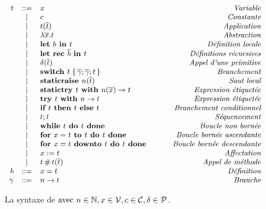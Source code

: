 \begin{figure}

\[\small
\begin{array}{rclr}
t
  & ::= & x & \qquad\textit{Variable} \\
  & |   & c & \qquad\textit{Constante} \\
  & |   & t (\overline{t}) & \qquad\textit{Application} \\
  & |   & \lambda \overline{x}. t & \qquad\textit{Abstraction} \\
  & |   & \textbf{let }b \textbf{ in } t & \qquad\textit{Définition locale} \\
  & |   & \textbf{let rec }\overline{b} \textbf{ in } t & \qquad\textit{Définitions récursives} \\
  & |   & \delta (\overline{t}) & \qquad\textit{Appel d'une primitive} \\
  & |   & \textbf{switch } t \;\{\, \overline{\gamma}; \overline{\gamma}; t \,\}
        & \qquad\textit{Branchement} \\
  & |   & \textbf{staticraise } n (\overline{t}) & \qquad\textit{Saut local} \\
  & |   & \textbf{statictry } t \textbf{ with } n (\overline{x}) \rightarrow t & \qquad\textit{Expression étiquetée} \\
  & |   & \textbf{try } t \textbf{ with } n \rightarrow t & \qquad\textit{Expression étiquetée} \\
  & |   & \textbf{if } t \textbf{ then } t \textbf{ else } t & \qquad\textit{Branchement conditionnel} \\
  & |   & t ; t & \qquad\textit{Séquencement} \\
  & |   & \textbf{while } t \textbf{ do } t \textbf{ done } & \qquad\textit{Boucle non bornée} \\
  & |   & \textbf{for } x = t \textbf{ to } t \textbf{ do } t \textbf{ done } & \qquad\textit{Boucle bornée ascendante} \\
  & |   & \textbf{for } x = t \textbf{ downto } t \textbf{ do } t \textbf{ done } & \qquad\textit{Boucle bornée descendante} \\
  & |   & x := t & \qquad\textit{Affectation} \\
  & |   & t \,\#\, t (\overline{t}) & \qquad\textit{Appel de méthode} \\
b & ::= & x = t & \qquad\textit{Définition} \\
\gamma  & ::= & n \rightarrow t & \qquad\textit{Branche} \\
\end{array}
\]
\caption{La syntaxe de {\LambdaCode}
$\textrm{avec }
n \in \mathbb{N},
x \in \mathcal{V},
c \in \mathcal{C},
\delta \in \mathcal{P}$.
}
\label{fig:lambda-syntax}
\end{figure}

